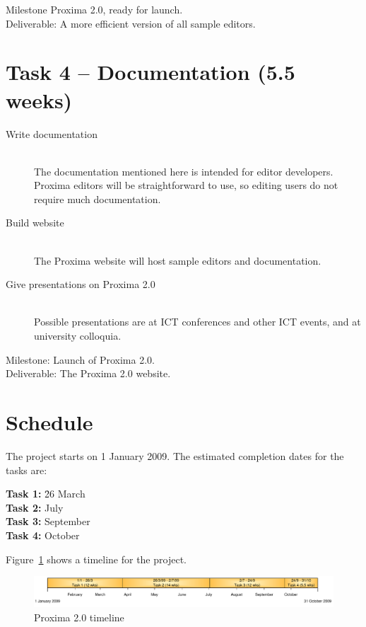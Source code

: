 \documentclass[10pt]{article}
\begin{document}
{\sc Milestone} Proxima 2.0, ready for launch.\\
{\sc Deliverable:} A more efficient version of all sample editors.

\section*{Task 4 -- Documentation (5.5 weeks)}

\begin{description}
\item[Write documentation]~\\
The documentation mentioned here is intended for editor developers. Proxima editors will be straightforward to use, so editing users do not require much documentation.

\item[Build website]~\\
The Proxima website will host sample editors and documentation.

\item[Give presentations on Proxima 2.0]~\\
Possible presentations are at ICT conferences and other ICT events, and at university colloquia.
\end{description}

{\sc Milestone: } Launch of Proxima 2.0.\\
{\sc Deliverable: } The Proxima 2.0 website.

\pagebreak
\section*{Schedule}

The project starts on 1 January 2009. The estimated completion dates for the tasks are:

\begin{tabbing}
{\bf Task 1:} \= 26 March \\
{\bf Task 2:}  July \\
{\bf Task 3:}  September \\
{\bf Task 4:}  October \\
\end{tabbing}



Figure~\ref{fig:timeline} shows a timeline for the project.
~\\

\begin{figure}[ht]
\centering
\includegraphics[width=\textwidth]{images/timeline}
\caption{Proxima 2.0 timeline}
\label{fig:timeline}
\end{figure}
\end{document}
